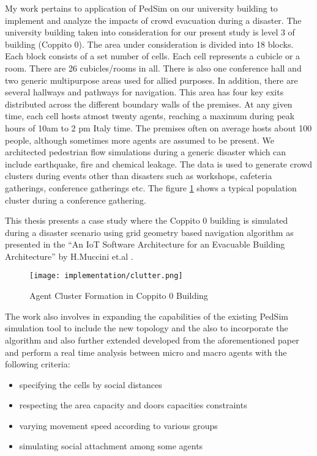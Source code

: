 My work pertains to application of PedSim on our university building to implement and analyze the impacts of crowd evacuation during a disaster. The university building taken into consideration for our present study is level 3 of building (Coppito 0). The area under consideration is divided into 18 blocks. Each block consists of a set number of cells. Each cell represents a cubicle or a room. There are 26 cubicles/rooms in all. There is also one conference hall and two generic multipurpose areas used for allied purposes. In addition, there are several hallways and pathways for navigation. This area has four key exits distributed across the different boundary walls of the premises. At any given time, each cell hosts atmost twenty agents, reaching a maximum during peak hours of 10am to 2 pm Italy time. The premises often on average hosts about 100 people, although sometimes more agents are assumed to be present. We architected pedestrian flow simulations during a generic disaster which can include earthquake, fire and chemical leakage. The data is used to generate crowd clusters during events other than disasters such as workshops, cafeteria gatherings, conference gatherings etc. The figure \ref{clutter} shows a typical population cluster during a conference gathering. 

This thesis presents a case study where the Coppito 0 building is simulated during a disaster scenario using grid geometry based navigation algorithm as presented in the “An IoT Software Architecture for an Evacuable Building Architecture” by H.Muccini et.al \cite{ref5}. 

\begin{figure}[H]
  \centering
  \texttt{[image: implementation/clutter.png]}
	\caption{Agent Cluster Formation in Coppito 0 Building}
  \label{clutter}
\end{figure}

The work also involves in expanding the capabilities of the existing PedSim simulation tool to include the new topology and the also to incorporate the algorithm and also further extended developed from the aforementioned paper and perform a real time analysis between micro and macro agents with the following criteria:

\begin{itemize}
  \item specifying the cells by social distances
  \item respecting the area capacity and doors capacities constraints
  \item varying movement speed according to various groups
  \item simulating social attachment among some agents 
\end{itemize}

